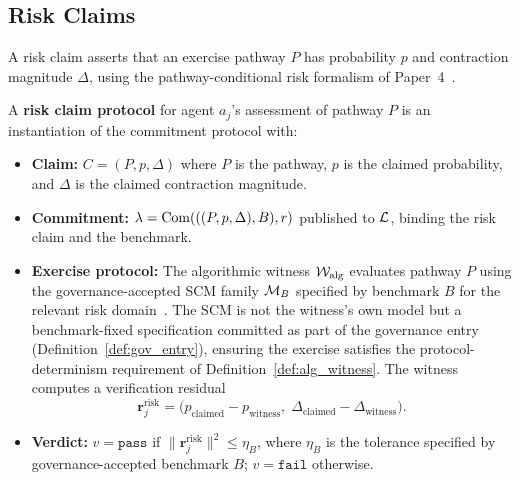 \subsection{Risk Claims}
\label{sec:risk_claims}

A risk claim asserts that an exercise pathway $P$ has probability $p$
and contraction magnitude $\Delta$, using the pathway-conditional risk
formalism of Paper~4~\citep{lasser2026scm}.

\begin{definition}
\label{def:risk_claim}
A \textbf{risk claim protocol} for agent $a_j$'s assessment of pathway
$P$ is an instantiation of the commitment protocol with:
\begin{itemize}
    \item \textbf{Claim:} $C = (P, p, \Delta)$ where $P$ is the
    pathway, $p$ is the claimed probability, and $\Delta$ is the
    claimed contraction magnitude.
    \item \textbf{Commitment:} $\lambda = \mathrm{Com}(((P, p, \Delta), B), r)$
    published to $\mathcal{L}$, binding the risk claim and the benchmark.
    \item \textbf{Exercise protocol:} The algorithmic witness
    $\mathcal{W}_{\mathrm{alg}}$ evaluates pathway $P$ using the
    governance-accepted SCM family $\mathcal{M}_B$ specified by benchmark $B$
    for the relevant risk domain~\citep{lasser2026scm}.  The SCM is
    not the witness's own model but a benchmark-fixed specification
    committed as part of the governance entry
    (Definition~\ref{def:gov_entry}), ensuring the exercise satisfies
    the protocol-determinism requirement of
    Definition~\ref{def:alg_witness}.  The witness computes
    a verification residual
    \[
        \mathbf{r}^{\mathrm{risk}}_j = \bigl(p_{\mathrm{claimed}} -
        p_{\mathrm{witness}},\; \Delta_{\mathrm{claimed}} -
        \Delta_{\mathrm{witness}}\bigr).
    \]
    \item \textbf{Verdict:} $v = \texttt{pass}$ if
    $\|\mathbf{r}^{\mathrm{risk}}_j\|^2 \leq \eta_B$, where $\eta_B$
    is the tolerance specified by governance-accepted benchmark $B$;
    $v = \texttt{fail}$ otherwise.
\end{itemize}
\end{definition}

